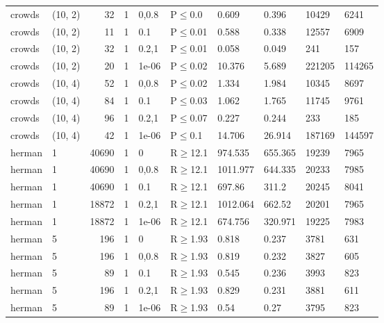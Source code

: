 \begin{longtable}{llrrllllll}
 crowds        & (10, 2)  &     	32 & 1 & 0,0.8 & P$\leq$0.0   & 0.609    & 0.396    & 10429   & 6241   \\
 crowds        & (10, 2)  &     	11 & 1 & 0.1   & P$\leq$0.01  & 0.588    & 0.338    & 12557   & 6909   \\
 crowds        & (10, 2)  &     	32 & 1 & 0.2,1 & P$\leq$0.01  & 0.058    & 0.049    & 241     & 157    \\
 crowds        & (10, 2)  &     	20 & 1 & 1e-06 & P$\leq$0.02  & 10.376   & 5.689    & 221205  & 114265 \\
 crowds        & (10, 4)  &     	52 & 1 & 0,0.8 & P$\leq$0.02  & 1.334    & 1.984    & 10345   & 8697   \\
 crowds        & (10, 4)  &     	84 & 1 & 0.1   & P$\leq$0.03  & 1.062    & 1.765    & 11745   & 9761   \\
 crowds        & (10, 4)  &     	96 & 1 & 0.2,1 & P$\leq$0.07  & 0.227    & 0.244    & 233     & 185    \\
 crowds        & (10, 4)  &     	42 & 1 & 1e-06 & P$\leq$0.1   & 14.706   & 26.914   & 187169  & 144597 \\
 herman        & 1        &  	40690 & 1 & 0     & R$\geq$12.1  & 974.535  & 655.365  & 19239   & 7965   \\
 herman        & 1        &  	40690 & 1 & 0,0.8 & R$\geq$12.1  & 1011.977 & 644.335  & 20233   & 7985   \\
 herman        & 1        &  	40690 & 1 & 0.1   & R$\geq$12.1  & 697.86   & 311.2    & 20245   & 8041   \\
 herman        & 1        &  	18872 & 1 & 0.2,1 & R$\geq$12.1  & 1012.064 & 662.52   & 20201   & 7965   \\
 herman        & 1        &  	18872 & 1 & 1e-06 & R$\geq$12.1  & 674.756  & 320.971  & 19225   & 7983   \\
 herman        & 5        &    	196 & 1 & 0     & R$\geq$1.93  & 0.818    & 0.237    & 3781    & 631    \\
 herman        & 5        &    	196 & 1 & 0,0.8 & R$\geq$1.93  & 0.819    & 0.232    & 3827    & 605    \\
 herman        & 5        &     	89 & 1 & 0.1   & R$\geq$1.93  & 0.545    & 0.236    & 3993    & 823    \\
 herman        & 5        &    	196 & 1 & 0.2,1 & R$\geq$1.93  & 0.829    & 0.231    & 3881    & 611    \\
 herman        & 5        &     	89 & 1 & 1e-06 & R$\geq$1.93  & 0.54     & 0.27     & 3795    & 823    \\

\end{longtable}
